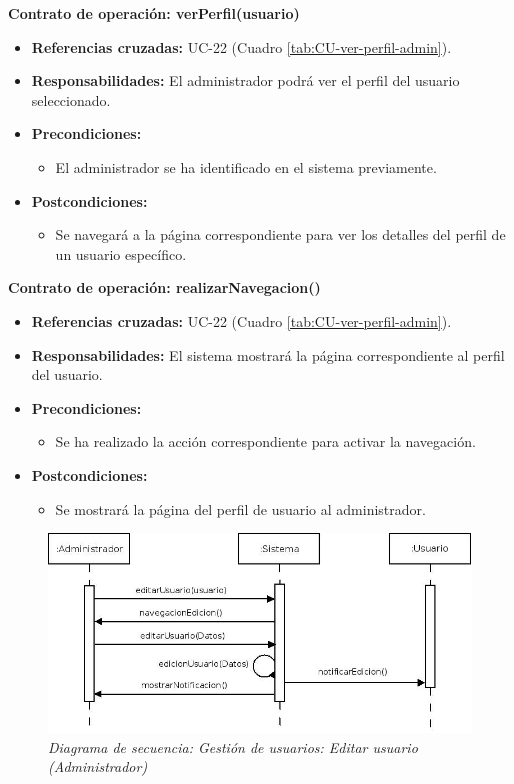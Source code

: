 \textbf{Contrato de operación: verPerfil(usuario)}
\begin{itemize}
\item \textbf{Referencias cruzadas:} UC-22 (Cuadro \ref{tab:CU-ver-perfil-admin}).
\item \textbf{Responsabilidades:} El administrador podrá ver el perfil del usuario seleccionado.
\item \textbf{Precondiciones:} 
 \begin{itemize}
\item El administrador se ha identificado en el sistema previamente.
\end {itemize}
\item \textbf{Postcondiciones:} 
 \begin{itemize}
\item Se navegará a la página correspondiente para ver los detalles del perfil de un usuario específico.
\end {itemize}
\end {itemize}

\textbf{Contrato de operación: realizarNavegacion()}
\begin{itemize}
\item \textbf{Referencias cruzadas:} UC-22 (Cuadro \ref{tab:CU-ver-perfil-admin}).
\item \textbf{Responsabilidades:} El sistema mostrará la página correspondiente al perfil del usuario.
\item \textbf{Precondiciones:} 
 \begin{itemize}
\item Se ha realizado la acción correspondiente para activar la navegación.
\end {itemize}
\item \textbf{Postcondiciones:} 
 \begin{itemize}
\item Se mostrará la página del perfil de usuario al administrador.
\end {itemize}
\end {itemize}


\vspace{10mm}

\begin{figure}[H]
\centering
  \includegraphics[scale=.50]{img/secuencias/gestion-usuarios-editar-usuario-administrador.jpeg}
  \caption{\textit{Diagrama de secuencia: Gestión de usuarios: Editar usuario (Administrador)}}
  \label{fig:secuencia-gestion-usuarios-editar-usuario-administrador}
\end{figure}

